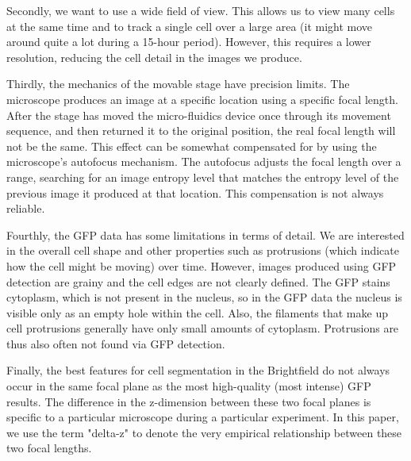 Secondly, we want to use a wide field of view. This allows us to view many cells at the same time and to track a single cell over a large area (it might move around quite a lot during a 15-hour period). However, this requires a lower resolution, reducing the cell detail in the images we produce.

Thirdly, the mechanics of the movable stage have precision limits. The microscope produces an image at a specific location using a specific focal length. After the stage has moved the micro-fluidics device once through its movement sequence, and then returned it to the original position, the real focal length will not be the same. This effect can be somewhat compensated for by using the microscope's autofocus mechanism. The autofocus adjusts the focal length over a range, searching for an image entropy level that matches the entropy level of the previous image it produced at that location. This compensation is not always reliable.

Fourthly, the GFP data has some limitations in terms of detail. We are interested in the overall  cell shape and other properties such as protrusions (which indicate how the cell might be moving) over time. However, images produced using GFP detection are grainy and the cell edges are not clearly defined. The GFP stains cytoplasm, which is not present in the nucleus, so in the GFP data the nucleus is visible only as an empty hole within the cell. Also, the filaments that make up cell protrusions generally have only small amounts of cytoplasm. Protrusions are thus also often not found via GFP detection.

Finally, the best features for cell segmentation in the Brightfield do not always occur in the same focal plane as the most high-quality (most intense) GFP results. The difference in the z-dimension between these two focal planes is specific to a particular microscope during a particular experiment. In this paper, we use the term "delta-z" to denote the very empirical relationship between these two focal lengths.
